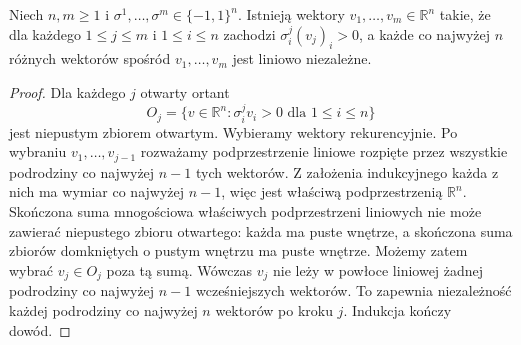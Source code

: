 \begin{lemat}
\label{lem:topog23-generic-vectors}
Niech \(n,m\ge1\) i
\(\sigma^1,\ldots,\sigma^m\in\{-1,1\}^n\).
Istnieją wektory \(v_1,\ldots,v_m\in\mathbb R^n\)
takie, że dla każdego \(1\le j\le m\)
i \(1\le i\le n\) zachodzi
\(\sigma_i^j(v_j)_i>0\),
a każde co najwyżej \(n\)
różnych wektorów spośród \(v_1,\ldots,v_m\)
jest liniowo niezależne.
\end{lemat}
\begin{proof}
Dla każdego \(j\) otwarty ortant
\[
 O_j=\{v\in\mathbb R^n:
       \sigma_i^j v_i>0\text{ dla }1\le i\le n\}
\]
jest niepustym zbiorem otwartym.
Wybieramy wektory rekurencyjnie.
Po wybraniu \(v_1,\ldots,v_{j-1}\)
rozważamy podprzestrzenie liniowe
rozpięte przez wszystkie podrodziny
co najwyżej \(n-1\) tych wektorów.
Z założenia indukcyjnego każda z nich
ma wymiar co najwyżej \(n-1\),
więc jest właściwą podprzestrzenią
\(\mathbb R^n\).
Skończona suma mnogościowa właściwych
podprzestrzeni liniowych nie może zawierać
niepustego zbioru otwartego:
każda ma puste wnętrze,
a skończona suma zbiorów
domkniętych o pustym wnętrzu
ma puste wnętrze.
Możemy zatem wybrać
\(v_j\in O_j\) poza tą sumą.
Wówczas \(v_j\) nie leży
w powłoce liniowej żadnej
podrodziny co najwyżej \(n-1\)
wcześniejszych wektorów.
To zapewnia niezależność
każdej podrodziny co najwyżej \(n\)
wektorów po kroku \(j\).
Indukcja kończy dowód.
\end{proof}

